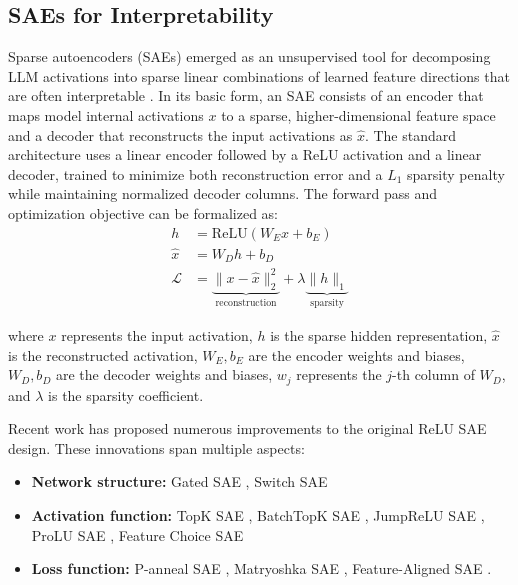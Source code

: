 \documentclass{article}
\theoremstyle{plain}
\theoremstyle{definition}
\theoremstyle{remark}
\begin{document}
\subsection{SAEs for Interpretability}
Sparse autoencoders (SAEs) emerged as an unsupervised tool for decomposing LLM activations into sparse linear combinations of learned feature directions that are often interpretable \cite{cunningham2023sparseautoencodershighlyinterpretable, bricken2023monosemanticity}. In its basic form, an SAE consists of an encoder that maps model internal activations $x$ to a sparse, higher-dimensional feature space and a decoder that reconstructs the input activations as $\hat{x}$. The standard architecture uses a linear encoder followed by a ReLU activation and a linear decoder, trained to minimize both reconstruction error and a $L_1$ sparsity penalty while maintaining normalized decoder columns. The forward pass and optimization objective can be formalized as:
\begin{align}
h &= \text{ReLU}(W_E x + b_E) \\
\hat{x} &= W_D h + b_D \\
\mathcal{L} &= \underbrace{\|x - \hat{x}\|_2^2}_{\text{reconstruction}} + \lambda \underbrace{\|h\|_1}_{\text{sparsity}}
\end{align}


where $x$ represents the input activation, $h$ is the sparse hidden representation, $\hat{x}$ is the reconstructed activation, $W_E, b_E$ are the encoder weights and biases, $W_D, b_D$ are the decoder weights and biases, $w_j$ represents the $j$-th column of $W_D$, and $\lambda$ is the sparsity coefficient.




Recent work has proposed numerous improvements to the original ReLU SAE design. These innovations span multiple aspects:
\begin{itemize}
\item \textbf{Network structure:} Gated SAE \cite{rajamanoharan2024improving}, Switch SAE \cite{mudide2024efficient}
\item \textbf{Activation function:} TopK SAE \cite{gao2024scaling}, BatchTopK SAE \cite{bussmann2024batchtopk}, JumpReLU SAE \cite{rajamanoharan2024jumping}, ProLU SAE \cite{taggart2024prolu}, Feature Choice SAE \cite{ayonrinde2024adaptivesparseallocationmutual}
\item \textbf{Loss function:} P-anneal SAE \cite{karvonen2024measuringprogressdictionarylearning}, Matryoshka SAE \cite{bussmann2024matryoshka}, Feature-Aligned SAE \cite{marks2024enhancingneuralnetworkinterpretability}.
\end{itemize}
\end{document}
